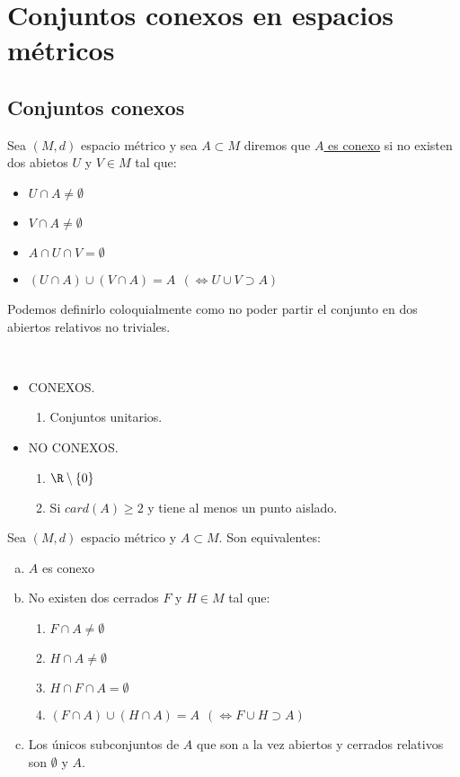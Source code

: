 \chapter{Conjuntos conexos en espacios métricos}
	\section{Conjuntos conexos}
	\begin{defi}
		Sea $(M,d)$ espacio métrico y sea $A\subset M$ diremos que \underline{$A$ es conexo} si no existen dos abietos $U$ y $V\in M$ tal que:\\
		\begin{itemize}
			\item $U\cap A \neq \emptyset$
			\item $V\cap A\neq\emptyset$
			\item $A\cap U\cap V= \emptyset$
			\item $(U\cap A)\cup (V\cap A) = A\ \ (\iff U\cup V \supset A)$
		\end{itemize}
		\begin{nota}
			Podemos definirlo coloquialmente como no poder partir el conjunto en dos abiertos relativos no triviales.
		\end{nota}
	\end{defi}
	\begin{ejem}\ 
	\begin{itemize}
	\item CONEXOS.
		\begin{enumerate}[1)]
			\item Conjuntos unitarios.
		\end{enumerate}
	\item NO CONEXOS. 
		\begin{enumerate}[1)]
			\item $\R \setminus \{0\}$
			\item Si $card(A) \geq 2$ y tiene al menos un punto aislado.
		\end{enumerate}
	\end{itemize}
	\end{ejem}
	\newpage
	\begin{proposicion} Sea $(M,d)$ espacio métrico y $A\subset M$. Son equivalentes:
		\begin{enumerate}[a)]
			\item $A$ es conexo
			\item No existen dos cerrados $F$ y $H \in M$ tal que:
				\begin{enumerate}[1)]
					\item $F\cap A \neq\emptyset$
					\item $H\cap A \neq\emptyset$
					\item $H\cap F \cap A =\emptyset$
					\item $(F\cap A)\cup (H\cap A) = A\ \ (\iff F\cup H \supset A)$
				\end{enumerate}					
			\item Los únicos subconjuntos de $A$ que son a la vez abiertos y cerrados relativos son $\emptyset$ y $A$.		
		\end{enumerate}
	\end{proposicion}
	

